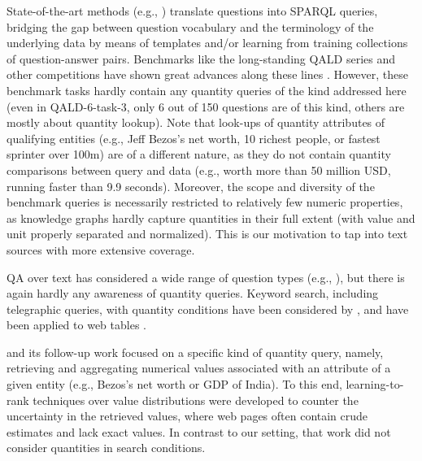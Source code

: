 State-of-the-art methods 
(e.g., \cite{DBLP:conf/acl/YihCHG15,DBLP:conf/cikm/BastH15,DBLP:conf/acl/XuRFHZ16,DBLP:conf/www/AbujabalRYW18,DBLP:journals/pvldb/ZhengYZC18}) 
translate questions into
SPARQL queries, bridging the gap between
question vocabulary and the terminology
of the underlying data by means of
templates and/or learning from
training collections of question-answer pairs.
Benchmarks like the long-standing 
QALD series and other competitions
have shown great advances along these lines
\cite{DBLP:journals/semweb/UsbeckRHCHNDU19}.
However, these benchmark tasks hardly
contain any quantity queries of the kind
addressed here (even in QALD-6-task-3, only 6 out of 150 questions are of this kind, others are mostly about quantity lookup). Note that look-ups of 
quantity attributes of qualifying entities
(e.g., Jeff Bezos's net worth, 10 richest people, or fastest sprinter over 100m)
are of a different nature, as they do not
contain quantity comparisons between query
and data (e.g., worth more than 50 million USD,
running faster than 9.9 seconds).
Moreover, the scope and diversity of the benchmark queries is necessarily restricted to relatively
few numeric properties, as knowledge graphs
hardly capture quantities in their full extent (with value and unit properly
separated and normalized). This is our motivation to tap
into text sources with more extensive coverage.

QA over text has considered a wide range
of question types (e.g., \cite{DBLP:conf/emnlp/Yang0ZBCSM18,DBLP:conf/acl/GardnerC18,DBLP:conf/acl/ChenFWB17}), but there
is again hardly any awareness of quantity queries.
Keyword search, including
telegraphic queries, with quantity conditions
have been considered by 
\cite{DBLP:conf/emnlp/JoshiSC14}, and have been applied
to web tables \cite{DBLP:journals/pvldb/PimplikarS12,DBLP:conf/kdd/SarawagiC14}. 

\cite{DBLP:conf/sigir/BanerjeeCR09} and
its follow-up work \cite{DBLP:conf/kdd/SarawagiC14}
focused on
a specific kind of quantity query, namely,
retrieving and aggregating numerical values
associated with an attribute of a given entity
(e.g., Bezos's net worth or GDP of India). To this end, 
learning-to-rank techniques over value distributions
were developed to
counter the uncertainty in the retrieved values,
where web pages often contain crude estimates
and lack exact values.
In contrast to our setting, that work did not
consider quantities in search conditions. 



